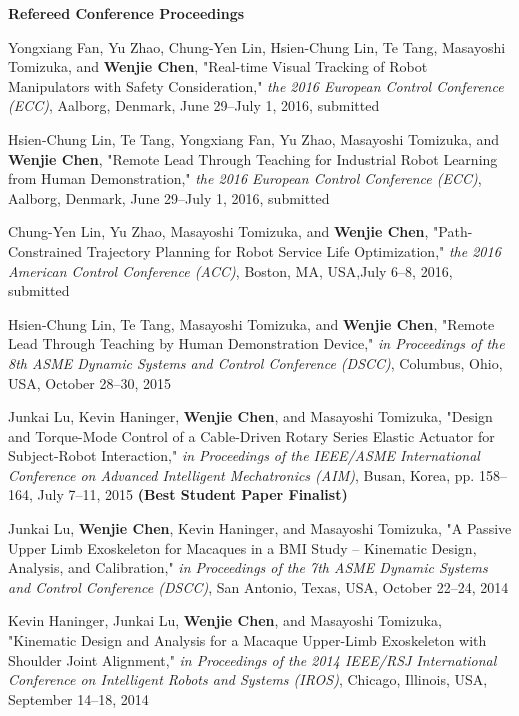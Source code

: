 \documentclass{res}
\begin{document}
\begin{resume}
    \textbf{Refereed Conference Proceedings} %
    \begin{etaremune}[start=20]
    \item Yongxiang Fan, Yu Zhao, Chung-Yen Lin, Hsien-Chung Lin, Te Tang, Masayoshi Tomizuka, and \textbf{Wenjie Chen}, "Real-time Visual Tracking of Robot Manipulators with Safety Consideration," \emph{the 2016 European Control Conference (ECC)}, Aalborg, Denmark, June 29--July 1, 2016, submitted
    \item Hsien-Chung Lin, Te Tang, Yongxiang Fan, Yu Zhao, Masayoshi Tomizuka, and \textbf{Wenjie Chen}, "Remote Lead Through Teaching for Industrial Robot Learning from Human Demonstration," \emph{the 2016 European Control Conference (ECC)}, Aalborg, Denmark, June 29--July 1, 2016, submitted
    \item Chung-Yen Lin, Yu Zhao, Masayoshi Tomizuka, and \textbf{Wenjie Chen}, "Path-Constrained Trajectory Planning for Robot Service Life Optimization," \emph{the 2016 American Control Conference (ACC)}, Boston, MA, USA,July 6--8, 2016, submitted
    \item Hsien-Chung Lin, Te Tang, Masayoshi Tomizuka, and \textbf{Wenjie Chen}, "Remote Lead Through Teaching by Human Demonstration Device," \emph{in Proceedings of the 8th ASME Dynamic Systems and Control Conference (DSCC)}, Columbus, Ohio, USA, October 28--30, 2015
    \item Junkai Lu, Kevin Haninger, \textbf{Wenjie Chen}, and Masayoshi Tomizuka, "Design and Torque-Mode Control of a Cable-Driven Rotary Series Elastic Actuator for Subject-Robot Interaction," \emph{in Proceedings of the IEEE/ASME International Conference on Advanced Intelligent Mechatronics (AIM)}, Busan, Korea, pp. 158--164, July 7--11, 2015 \textbf{(Best Student Paper Finalist)} 
    \item Junkai Lu, \textbf{Wenjie Chen}, Kevin Haninger, and Masayoshi Tomizuka, "A Passive Upper Limb Exoskeleton for Macaques in a BMI Study -- Kinematic Design, Analysis, and Calibration," \emph{in Proceedings of the 7th ASME Dynamic Systems and Control Conference (DSCC)}, San Antonio, Texas, USA, October 22--24, 2014
    \item Kevin Haninger, Junkai Lu, \textbf{Wenjie Chen}, and Masayoshi Tomizuka, "Kinematic Design and Analysis for a Macaque Upper-Limb Exoskeleton with Shoulder Joint Alignment," \emph{in Proceedings of the 2014 IEEE/RSJ International Conference on Intelligent Robots and Systems (IROS)}, Chicago, Illinois, USA, September 14--18, 2014

\end{etaremune}
\end{resume}
\end{document}
